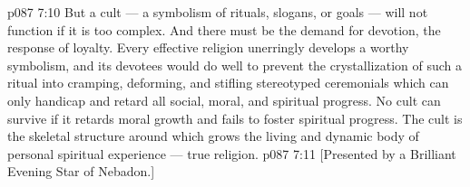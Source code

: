 \vs p087 7:10 But a cult --- a symbolism of rituals, slogans, or goals --- will not function if it is too complex. And there must be the demand for devotion, the response of loyalty. Every effective religion unerringly develops a worthy symbolism, and its devotees would do well to prevent the crystallization of such a ritual into cramping, deforming, and stifling stereotyped ceremonials which can only handicap and retard all social, moral, and spiritual progress. No cult can survive if it retards moral growth and fails to foster spiritual progress. The cult is the skeletal structure around which grows the living and dynamic body of personal spiritual experience --- true religion.
\vsetoff
\vs p087 7:11 [Presented by a Brilliant Evening Star of Nebadon.]
